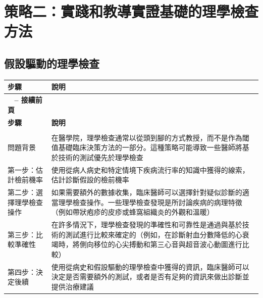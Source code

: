 \documentclass[12pt,a4paper]{article}
\begin{document}
\section{策略二：實踐和教導實證基礎的理學檢查方法}

\subsection{假設驅動的理學檢查}

\begin{longtable}{>{\raggedright\arraybackslash}p{3cm} >{\raggedright\arraybackslash}p{12cm}}
\toprule
\textbf{\textcolor{emergency_red}{步驟}} & \textbf{\textcolor{emergency_red}{說明}} \\
\midrule
\endfirsthead

\multicolumn{2}{c}%
{{\bfseries \tablename\ \thetable{} -- 接續前頁}} \\
\toprule
\textbf{\textcolor{emergency_red}{步驟}} & \textbf{\textcolor{emergency_red}{說明}} \\
\midrule
\endhead

\midrule \multicolumn{2}{r}{{接續下頁}} \\ \midrule
\endfoot

\bottomrule
\endlastfoot

\textcolor{emergency_blue}{問題背景} & 在醫學院，理學檢查通常以從頭到腳的方式教授，而不是作為閾值基礎臨床決策方法的一部分。這種策略可能導致一些醫師將基於技術的測試優先於理學檢查 \\

\textcolor{emergency_blue}{第一步：估計檢前機率} & 使用從病人病史和特定情境下疾病流行率的知識中獲得的線索，估計診斷假設的檢前機率 \\

\textcolor{emergency_blue}{第二步：選擇理學檢查操作} & 如果需要額外的數據收集，臨床醫師可以選擇針對疑似診斷的適當理學檢查操作。一些理學檢查發現是所討論疾病的病理特徵（例如帶狀疱疹的皮疹或蜂窩組織炎的外觀和溫暖） \\

\textcolor{emergency_blue}{第三步：比較準確性} & 在許多情況下，理學檢查發現的準確性和可靠性是通過與基於技術的測試進行比較來確定的（例如，在診斷射血分數降低的心衰竭時，將側向移位的心尖搏動和第三心音與超音波心動圖進行比較） \\

\textcolor{emergency_blue}{第四步：決定後續} & 使用從病史和假設驅動的理學檢查中獲得的資訊，臨床醫師可以決定是否需要額外的測試，或者是否有足夠的資訊來做出診斷並提供治療建議 \\
\end{longtable}
\end{document}
